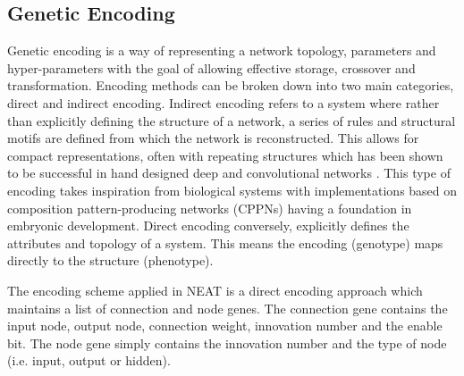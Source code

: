 \documentclass{article}
\begin{document}
		



	\subsection{Genetic Encoding}\label{encoding}



		Genetic encoding is a way of representing a network topology, parameters and hyper-parameters with the goal of allowing effective storage, crossover and transformation. Encoding methods can be broken down into two main categories, direct and indirect encoding.
		Indirect encoding refers to a system where rather than explicitly defining the structure of a network, a series of rules and structural motifs are defined from which the network is reconstructed. This allows for compact representations, often with repeating structures which has been shown to be successful in hand designed deep and convolutional networks \cite{DNN} \cite{CNN}. This type of encoding takes inspiration from biological systems with implementations based on composition pattern-producing networks (CPPNs) \cite{CPPN} having a foundation in embryonic development.\cite{NE}
		Direct encoding conversely, explicitly defines the attributes and topology of a system. This means the encoding (genotype) maps directly to the structure (phenotype). 

		The encoding scheme applied in NEAT is a direct encoding approach which maintains a list of connection and node genes. The connection gene contains the input node, output node, connection weight, innovation number and the enable bit. The node gene simply contains the innovation number and the type of node (i.e. input, output or hidden).
\end{document}
